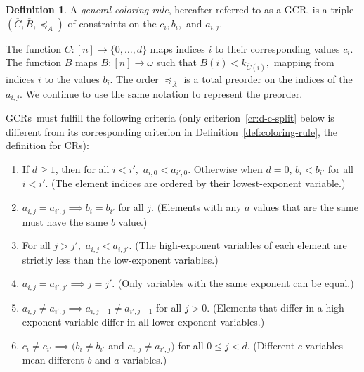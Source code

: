 \documentclass[11pt]{article}
\newcommand{\crulenospace}{CR}
\newcommand{\crulesnospace}{\crulenospace s}
\newcommand{\gencrulenospace}{GCR}
\newcommand{\gencruleLong}{general coloring rule}
\newcommand{\gencrules}{\gencrulenospace s~}
\newcommand{\xleq}{\preceq_{\overline{A}}}
\newcommand{\assny}{\overline{B}}
\newcommand{\assnc}{\overline{C}}
\newcommand{\numpoints}{n}
\newcommand{\inumpoints}{i}
\newcommand{\idegr}{j}
\newcommand{\commonconst}{a}
\newcommand{\rareconst}{b}
\theoremstyle{plain}
\theoremstyle{definition}
\newtheorem{definition}[theorem]{Definition}
\begin{document}
\begin{definition}
A \textit{\gencruleLong}, hereafter referred to as a \gencrulenospace, is a triple $(\assnc,\assny, \xleq)$ of constraints on the $c_{\inumpoints}, \rareconst_{\inumpoints},$ and $\commonconst_{\inumpoints,\idegr}$.

The function $\assnc: [\numpoints] \to \{0,\dots,d\}$ maps indices $\inumpoints$ to their corresponding values $c_{\inumpoints}$. The function $\assny$ maps $\assny: [\numpoints] \to \omega$ such that $\assny(\inumpoints) < k_{\assnc(\inumpoints)},$ mapping from indices $\inumpoints$ to the values $\rareconst_{\inumpoints}$. The order $\xleq$ is a total preorder on the indices of the $\commonconst_{\inumpoints,\idegr}$. We continue to use the same notation to represent the preorder.

\gencrules must fulfill the following criteria (only criterion~\ref{cr:d-c-split} below is different from its corresponding criterion in Definition~\ref{def:coloring-rule}, the definition for \crulesnospace):
\begin{enumerate}
    \item \label{cr:d-index-ordering} If $d \geq 1$, then for all $\inumpoints < \inumpoints',$ $\commonconst_{\inumpoints, 0} < \commonconst_{\inumpoints', 0}.$ Otherwise when $d = 0$, $\rareconst_{\inumpoints} < \rareconst_{\inumpoints'}$ for all $\inumpoints<\inumpoints'$. (The element indices are ordered by their lowest-exponent variable.)
    \item \label{cr:d-y-distinct} $\commonconst_{\inumpoints,\idegr} = \commonconst_{\inumpoints',\idegr} \implies \rareconst_{\inumpoints} = \rareconst_{\inumpoints'}$ for all $\idegr$. (Elements with any $\commonconst$ values that are the same must have the same $\rareconst$ value.)
    \item \label{cr:d-high-first} For all $\idegr > \idegr',$ $\commonconst_{\inumpoints ,\idegr} < \commonconst_{\inumpoints, \idegr'}.$ (The high-exponent variables of each element are strictly less than the low-exponent variables.)
    
    \item \label{cr:d-term-dim-diff} $\commonconst_{\inumpoints, \idegr} = \commonconst_{\inumpoints' ,\idegr'} \implies \idegr = \idegr'$. (Only variables with the same exponent can be equal.)
    \item \label{cr:d-high-split} $\commonconst_{\inumpoints, \idegr} \neq \commonconst_{\inumpoints' ,\idegr} \implies \commonconst_{\inumpoints,\idegr-1} \neq \commonconst_{\inumpoints',\idegr-1}$ for all $\idegr>0$. (Elements that differ in a high-exponent variable differ in all lower-exponent variables.)
    \item \label{cr:d-c-split} $c_{\inumpoints} \neq c_{\inumpoints'} \implies (\rareconst_{\inumpoints} \neq \rareconst_{\inumpoints'}$ and $\commonconst_{\inumpoints ,\idegr} \neq \commonconst_{\inumpoints', \idegr})$ for all $0 \leq \idegr < d$. (Different $c$ variables mean different $\rareconst$ and $\commonconst$ variables.)
\end{enumerate}
\end{definition}
\end{document}
